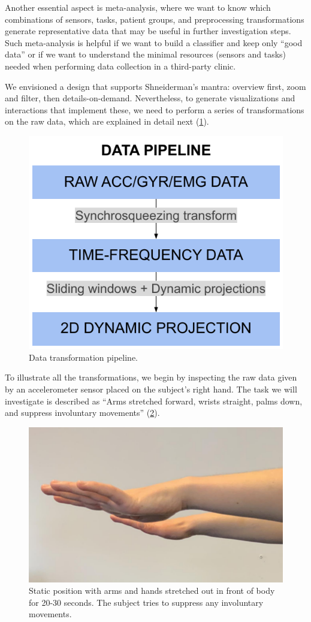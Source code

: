 Another essential aspect is meta-analysis, where we want to know which combinations of sensors, tasks, patient groups, and preprocessing transformations generate representative data that may be useful in further investigation steps. Such meta-analysis is helpful if we want to build a classifier and keep only ``good data'' or if we want to understand the minimal resources (sensors and tasks) needed when performing data collection in a third-party clinic.

We envisioned a design that supports Shneiderman's mantra: overview first, zoom and filter, then details-on-demand. Nevertheless, to generate visualizations and interactions that implement these, we need to perform a series of transformations on the raw data, which are explained in detail next (\cref{fig:nemo-pipe}). 

\begin{figure}[ht]
\centering
\includegraphics[width=.5\linewidth]{figures/nemo/simple-pipeline.pdf}
\caption{Data transformation pipeline.}
\label{fig:nemo-pipe}
\end{figure}

To illustrate all the transformations, we begin by inspecting the raw data given by an accelerometer sensor placed on the subject's right hand. The task we will investigate is described as ``Arms stretched forward, wrists straight, palms down, and suppress involuntary movements'' (\cref{fig:hands}).

\begin{figure}[ht]
\centering
\includegraphics[width=.5\linewidth]{figures/nemo/hands.png}
\caption{Static position with arms and hands stretched out in front of body for 20-30 seconds. The subject tries to suppress any involuntary movements.}
\label{fig:hands}
\end{figure}

